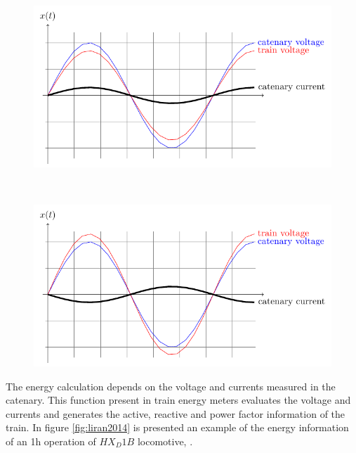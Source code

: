\begin{figure}[h!]
	\centering
	\begin{minipage}{.48\textwidth}
		\centering
			\includegraphics[width=1\textwidth,keepaspectratio]{figures/32.EnergyS/traction}
		\label{fig:traction}
	\end{minipage}%
	\begin{minipage}{.01\textwidth}  ~\end{minipage}	
	\begin{minipage}{.48\textwidth}
		\centering
		\includegraphics[width=1\textwidth,keepaspectratio]{figures/32.EnergyS/generation}

		
		\label{fig:generation}
	\end{minipage}
\end{figure}

The energy calculation depends on the voltage and currents measured in the catenary. This function present in train energy meters evaluates the voltage and currents and generates the active, reactive and power factor information of the train. In figure \ref{fig:liran2014} is presented an example of the energy information of an 1h operation of {$HX_D1B$} locomotive, \cite{liran2014}.


